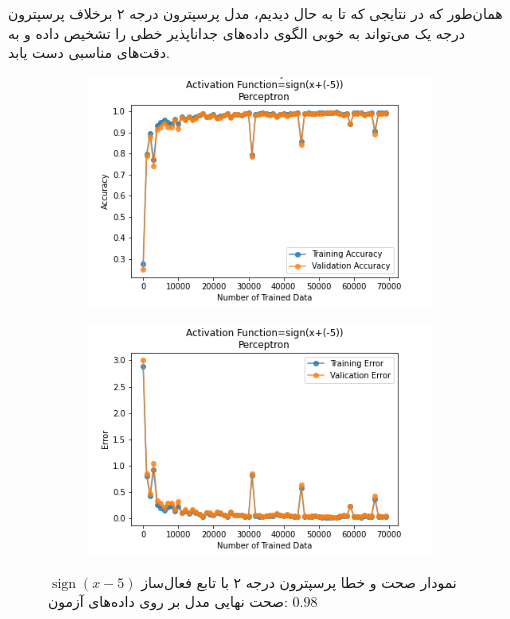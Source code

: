\documentclass[12pt, a4paper]{article}
\DeclareMathOperator{\sign}{sign}
\begin{document}
همان‌طور که در نتایجی که تا به حال دیدیم، مدل پرسپترون درجه ۲ برخلاف پرسپترون درجه یک
می‌تواند به خوبی الگوی داده‌های جداناپذیر
خطی را تشخیص داده و به دقت‌های مناسبی دست یابد.

\begin{figure}[h]
    \begin{subfigure}{0.45\linewidth}
        \centering
        \includegraphics[width=\linewidth]{images/6/perceptron/activation_func/5.png}
    \end{subfigure}
    \hfil
    \begin{subfigure}{0.45\linewidth}
        \centering
        \includegraphics[width=\linewidth]{images/6/perceptron/activation_func/6.png}
    \end{subfigure}
    \caption{نمودار صحت و خطا پرسپترون درجه ۲ با تابع فعال‌ساز $\sign(x-5)$
    \newline
    صحت نهایی مدل بر روی داده‌های آزمون: $0.98$}
\end{figure}
\end{document}
